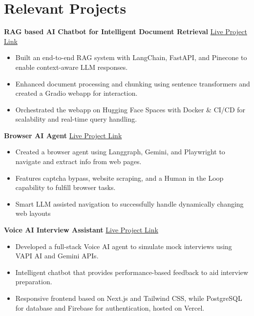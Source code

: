 \documentclass[10pt, a4paper]{article}
\begin{document}
\vspace{4pt}

\section*{Relevant Projects}
\vspace{2pt}
\textbf{RAG based AI Chatbot for Intelligent Document Retrieval} \hfill \href{https://huggingface.co/spaces/Tsk001/RAG_Gradio_App}{Live Project Link}
\begin{itemize}
    \item Built an end-to-end RAG system with LangChain, FastAPI, and Pinecone to enable context-aware LLM responses.
    \item Enhanced document processing and chunking using sentence transformers and created a Gradio webapp for interaction. 
    \item Orchestrated the webapp on Hugging Face Spaces with Docker \& CI/CD for scalability and real-time query handling. 
\end{itemize}
\vspace{2pt}

\textbf{Browser AI Agent} \hfill \href{https://github.com/tanmaysk001/Browser-Agent}{Live Project Link}
\begin{itemize}
    \item Created a browser agent using Langgraph, Gemini, and Playwright to navigate and extract info from web pages. 
    \item Features captcha bypass, website scraping, and a Human in the Loop capability to fulfill browser tasks. 
    \item Smart LLM assisted navigation to successfully handle dynamically changing web layouts
\end{itemize}
\vspace{2pt}

\textbf{Voice AI Interview Assistant} \hfill \href{https://github.com/tanmaysk001/Interview-AI}{Live Project Link}
\begin{itemize}
    \item Developed a full-stack Voice AI agent to simulate mock interviews using VAPI AI and Gemini APIs.
    \item Intelligent chatbot that provides performance-based feedback to aid interview preparation. 
    \item Responsive frontend based on Next.js and Tailwind CSS, while PostgreSQL for database and Firebase for authentication, hosted on Vercel. 
\end{itemize}
\end{document}
